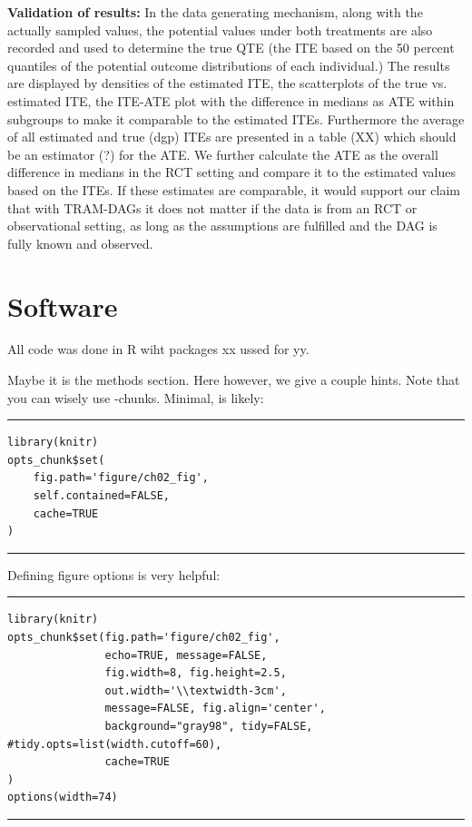 \textbf{Validation of results: } In the data generating mechanism, along with the actually sampled values, the potential values under both treatments are also recorded and used to determine the true QTE (the ITE based on the 50 percent quantiles of the potential outcome distributions of each individual.)
The results are displayed by densities of the estimated ITE, the scatterplots of the true vs. estimated ITE, the ITE-ATE plot with the difference in medians as ATE within subgroups to make it comparable to the estimated ITEs. Furthermore the average of all estimated and true (dgp) ITEs are presented in a table (XX) which should be an estimator (?) for the ATE. We further calculate the ATE as the overall difference in medians in the RCT setting and compare it to the estimated values based on the ITEs. If these estimates are comparable, it would support our claim that with TRAM-DAGs it does not matter if the data is from an RCT or observational setting, as long as the assumptions are fulfilled and the DAG is fully known and observed.



\section{Software}

All code was done in R wiht packages xx ussed for yy.




Maybe it is the methods section. Here however, we give a couple hints.
Note that you can wisely use -chunks. Minimal, is likely:


\bigskip

\hrule
\begin{knitrout}
\color{fgcolor}\begin{kframe}
\begin{verbatim}
library(knitr)
opts_chunk$set(
    fig.path='figure/ch02_fig',
    self.contained=FALSE,
    cache=TRUE
)
\end{verbatim}
\end{kframe}
\end{knitrout}
\hrule

\bigskip

Defining figure options is very helpful:


\bigskip


\hrule
\begin{knitrout}
\color{fgcolor}\begin{kframe}
\begin{verbatim}
library(knitr)
opts_chunk$set(fig.path='figure/ch02_fig',
               echo=TRUE, message=FALSE,
               fig.width=8, fig.height=2.5,
               out.width='\\textwidth-3cm',
               message=FALSE, fig.align='center',
               background="gray98", tidy=FALSE, #tidy.opts=list(width.cutoff=60),
               cache=TRUE
)
options(width=74)
\end{verbatim}
\end{kframe}
\end{knitrout}
\hrule

